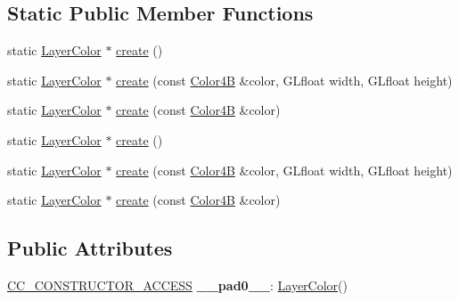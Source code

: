 \subsection*{Static Public Member Functions}
\begin{DoxyCompactItemize}
\item 
static \hyperlink{classLayerColor}{Layer\+Color} $\ast$ \hyperlink{classLayerColor_ad4e1fadb3564da142f3dae592ab68f9c}{create} ()
\item 
static \hyperlink{classLayerColor}{Layer\+Color} $\ast$ \hyperlink{classLayerColor_a21f9f5d8149c7ece8efbdb0e317a5ca3}{create} (const \hyperlink{structColor4B}{Color4B} \&color, G\+Lfloat width, G\+Lfloat height)
\item 
static \hyperlink{classLayerColor}{Layer\+Color} $\ast$ \hyperlink{classLayerColor_a3c17081519fb23b7b88f4ff6aa3273d5}{create} (const \hyperlink{structColor4B}{Color4B} \&color)
\item 
static \hyperlink{classLayerColor}{Layer\+Color} $\ast$ \hyperlink{classLayerColor_a20b32d181d75de6c70e93eb107b6c6e4}{create} ()
\item 
static \hyperlink{classLayerColor}{Layer\+Color} $\ast$ \hyperlink{classLayerColor_a56f20b3e458b3d8c49ac24c9b397c427}{create} (const \hyperlink{structColor4B}{Color4B} \&color, G\+Lfloat width, G\+Lfloat height)
\item 
static \hyperlink{classLayerColor}{Layer\+Color} $\ast$ \hyperlink{classLayerColor_a3dcb37c938e5e7fd3e16879c53b6f2b2}{create} (const \hyperlink{structColor4B}{Color4B} \&color)
\end{DoxyCompactItemize}
\subsection*{Public Attributes}
\begin{DoxyCompactItemize}
\item 
\mbox{\label{classLayerColor_ab6ffb0463b919c0aea5e4e19449fa786}} 
\hyperlink{_2cocos2d_2cocos_2base_2ccConfig_8h_a25ef1314f97c35a2ed3d029b0ead6da0}{C\+C\+\_\+\+C\+O\+N\+S\+T\+R\+U\+C\+T\+O\+R\+\_\+\+A\+C\+C\+E\+SS} {\bfseries \+\_\+\+\_\+pad0\+\_\+\+\_\+}\+: \hyperlink{classLayerColor}{Layer\+Color}()
\end{DoxyCompactItemize}
